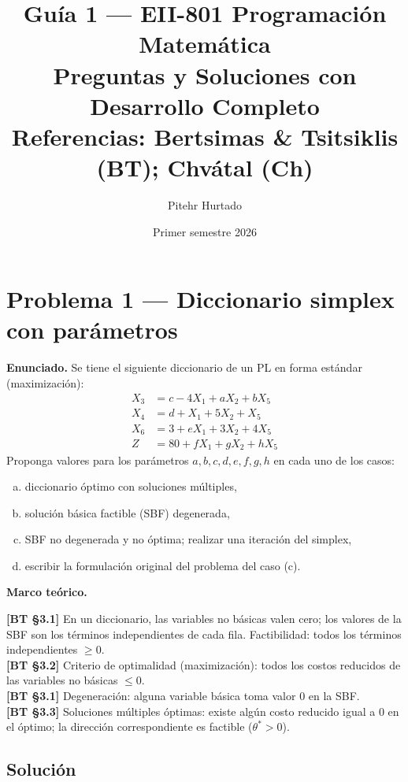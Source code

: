 \documentclass{article}
\title{\textbf{Guía 1 --- EII-801 Programación Matemática\\[4pt]
\large Preguntas y Soluciones con Desarrollo Completo\\[2pt]
\normalsize Referencias: Bertsimas \& Tsitsiklis (BT); Chvátal (Ch)}}
\author{Pitehr Hurtado}
\date{Primer semestre 2026}
\newenvironment{marco}{\begin{mdframed}[linecolor=black!40,backgroundcolor=gray!5]\small\textbf{Marco teórico.}\par\smallskip}{\end{mdframed}\medskip}
\begin{document}
\maketitle
\tableofcontents
\newpage

\section*{Problema 1 --- Diccionario simplex con parámetros}

\textbf{Enunciado.} Se tiene el siguiente diccionario de un PL en forma estándar (maximización):
\begin{align*}
X_3 &= c - 4X_1 + aX_2 + bX_5 \\
X_4 &= d + X_1 + 5X_2 + X_5 \\
X_6 &= 3 + eX_1 + 3X_2 + 4X_5 \\
Z   &= 80 + fX_1 + gX_2 + hX_5
\end{align*}
Proponga valores para los parámetros $a,b,c,d,e,f,g,h$ en cada uno de los casos:
\begin{enumerate}[a)]
  \item diccionario óptimo con soluciones múltiples,
  \item solución básica factible (SBF) degenerada,
  \item SBF no degenerada y no óptima; realizar una iteración del simplex,
  \item escribir la formulación original del problema del caso (c).
\end{enumerate}

\begin{marco}
\textbf{[BT §3.1]} En un diccionario, las variables no básicas valen cero; los valores de la SBF son los términos independientes de cada fila. Factibilidad: todos los términos independientes $\geq 0$. \\[2pt]
\textbf{[BT §3.2]} Criterio de optimalidad (maximización): todos los costos reducidos de las variables no básicas $\leq 0$. \\[2pt]
\textbf{[BT §3.1]} Degeneración: alguna variable básica toma valor $0$ en la SBF. \\[2pt]
\textbf{[BT §3.3]} Soluciones múltiples óptimas: existe algún costo reducido igual a $0$ en el óptimo; la dirección correspondiente es factible ($\theta^* > 0$).
\end{marco}

\subsection*{Solución}
\end{document}
